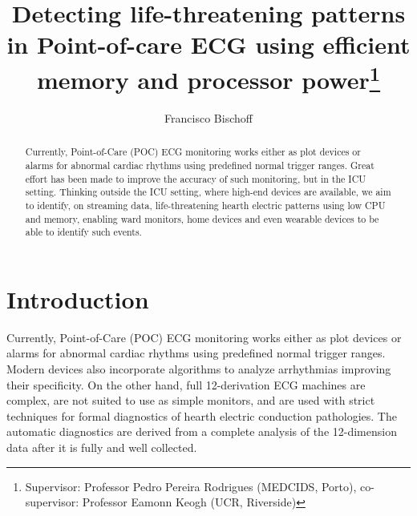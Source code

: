 \documentclass[runningheads]{llncs}
\begin{document}
%
\title{Detecting life-threatening patterns in Point-of-care ECG using efficient memory and processor power\thanks{Supervisor: Professor Pedro Pereira Rodrigues (MEDCIDS, Porto), co-supervisor: Professor Eamonn Keogh (UCR, Riverside)}}
%
%
%
\author{  Francisco Bischoff }

%


\maketitle              %
%

\begin{abstract}
  Currently, Point-of-Care (POC) ECG monitoring works either as plot devices or alarms for abnormal
  cardiac rhythms using predefined normal trigger ranges. Great effort has been made to improve the
  accuracy of such monitoring, but in the ICU setting. Thinking outside the ICU setting, where
  high-end devices are available, we aim to identify, on streaming data, life-threatening hearth
  electric patterns using low CPU and memory, enabling ward monitors, home devices and even wearable
  devices to be able to identify such events.


\end{abstract}
%
%

\hypertarget{introduction}{%
\section{Introduction}\label{introduction}}

Currently, Point-of-Care (POC) ECG monitoring works either as plot devices or alarms for abnormal
cardiac rhythms using predefined normal trigger ranges. Modern devices also incorporate algorithms
to analyze arrhythmias improving their specificity. On the other hand, full 12-derivation ECG
machines are complex, are not suited to use as simple monitors, and are used with strict techniques
for formal diagnostics of hearth electric conduction pathologies. The automatic diagnostics are
derived from a complete analysis of the 12-dimension data after it is fully and well collected.
\end{document}
